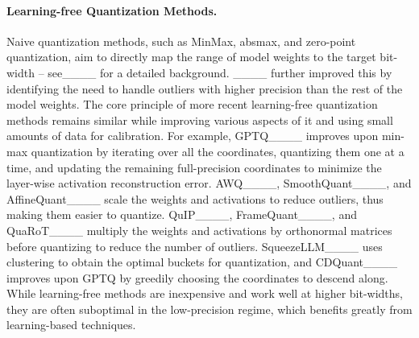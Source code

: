 \paragraph{Learning-free Quantization Methods.} Naive quantization methods, such as MinMax, absmax, and zero-point quantization, aim to directly map the range of model weights to the target bit-width -- see____ for a detailed background. ____ further improved this by identifying the need to handle outliers with higher precision than the rest of the model weights. The core principle of more recent learning-free quantization methods remains similar while improving various aspects of it and using small amounts of data for calibration. For example, GPTQ____ improves upon min-max quantization by iterating over all the coordinates, quantizing them one at a time, and updating the remaining full-precision coordinates to minimize the layer-wise activation reconstruction error. AWQ____, SmoothQuant____, and AffineQuant____ scale the weights and activations to reduce outliers, thus making them easier to quantize. QuIP____, FrameQuant____, and QuaRoT____ multiply the weights and activations by orthonormal matrices before quantizing to reduce the number of outliers. SqueezeLLM____ uses clustering to obtain the optimal buckets for quantization, and CDQuant____ improves upon GPTQ by greedily choosing the coordinates to descend along. While learning-free methods are inexpensive and work well at higher bit-widths, they are often suboptimal in the low-precision regime, which benefits greatly from learning-based techniques.


